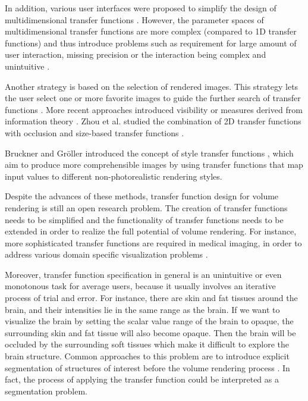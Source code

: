 \documentclass{egpubl}
\begin{document}
In addition, various user interfaces were proposed to simplify the design of multidimensional transfer functions \cite{tzeng_novel_2003} \cite{tzeng_cluster-space_2004}.
However, the parameter spaces of multidimensional transfer functions are more complex (compared to 1D transfer functions) and thus introduce problems such as requirement for large amount of user interaction, missing precision or the interaction being complex and unintuitive \cite{arens_survey_2010}.

Another strategy is based on the selection of rendered images. This strategy lets the user select one or more favorite images to guide the further search of transfer functions \cite{marks_design_1997} \cite{wu_interactive_2007}. More recent approaches introduced visibility \cite{correa_visibility-driven_2009} \cite{correa_visibility_2011} or measures derived from information theory \cite{haidacher_information-based_2008} \cite{bruckner_isosurface_2010} \cite{ruiz_automatic_2011} \cite{bramon_information_2013}. Zhou et al. studied the combination of 2D transfer functions with occlusion and size-based transfer functions \cite{zhou_transfer_2012}.

Bruckner and Gr{\"o}ller introduced the concept of style transfer functions \cite{bruckner_style_2007}, which aim to produce more comprehensible images by using transfer functions that map input values to different non-photorealistic rendering styles.

Despite the advances of these methods, transfer function design for volume rendering is still an open research problem.
The creation of transfer functions needs to be simplified and the functionality of transfer functions needs to be extended in order to realize the full potential of volume rendering. For instance, more sophisticated transfer functions are required in medical imaging, in order to address various domain specific visualization problems \cite{lindholm_spatial_2010}.

Moreover, transfer function specification in general is an unintuitive or even monotonous task for average users, because it usually involves an iterative process of trial and error.
For instance, there are skin and fat tissues around the brain, and their intensities lie in the same range as the brain. If we want to visualize the brain by setting the scalar value range of the brain to opaque, the surrounding skin and fat tissue will also become opaque. Then the brain will be occluded by the surrounding soft tissues which make it difficult to explore the brain structure.
Common approaches to this problem are to introduce explicit segmentation of structures of interest before the volume rendering process \cite{rezk-salama_opacity_2006}. In fact, the process of applying the transfer function could be interpreted as a segmentation problem.
\end{document}
